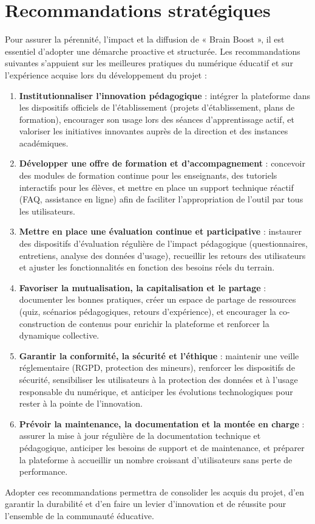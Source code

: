\documentclass[a4paper,11pt]{report}
\begin{document}
\section{Recommandations stratégiques}
Pour assurer la pérennité, l'impact et la diffusion de « Brain Boost », il est essentiel d'adopter une démarche proactive et structurée. Les recommandations suivantes s'appuient sur les meilleures pratiques du numérique éducatif et sur l'expérience acquise lors du développement du projet :
\begin{enumerate}
    \item \textbf{Institutionnaliser l'innovation pédagogique} : intégrer la plateforme dans les dispositifs officiels de l'établissement (projets d'établissement, plans de formation), encourager son usage lors des séances d'apprentissage actif, et valoriser les initiatives innovantes auprès de la direction et des instances académiques.
    \item \textbf{Développer une offre de formation et d'accompagnement} : concevoir des modules de formation continue pour les enseignants, des tutoriels interactifs pour les élèves, et mettre en place un support technique réactif (FAQ, assistance en ligne) afin de faciliter l'appropriation de l'outil par tous les utilisateurs.
    \item \textbf{Mettre en place une évaluation continue et participative} : instaurer des dispositifs d'évaluation régulière de l'impact pédagogique (questionnaires, entretiens, analyse des données d'usage), recueillir les retours des utilisateurs et ajuster les fonctionnalités en fonction des besoins réels du terrain.
    \item \textbf{Favoriser la mutualisation, la capitalisation et le partage} : documenter les bonnes pratiques, créer un espace de partage de ressources (quiz, scénarios pédagogiques, retours d'expérience), et encourager la co-construction de contenus pour enrichir la plateforme et renforcer la dynamique collective.
    \item \textbf{Garantir la conformité, la sécurité et l'éthique} : maintenir une veille réglementaire (RGPD, protection des mineurs), renforcer les dispositifs de sécurité, sensibiliser les utilisateurs à la protection des données et à l'usage responsable du numérique, et anticiper les évolutions technologiques pour rester à la pointe de l'innovation.
    \item \textbf{Prévoir la maintenance, la documentation et la montée en charge} : assurer la mise à jour régulière de la documentation technique et pédagogique, anticiper les besoins de support et de maintenance, et préparer la plateforme à accueillir un nombre croissant d'utilisateurs sans perte de performance.
\end{enumerate}
Adopter ces recommandations permettra de consolider les acquis du projet, d'en garantir la durabilité et d'en faire un levier d'innovation et de réussite pour l'ensemble de la communauté éducative.
\end{document}
